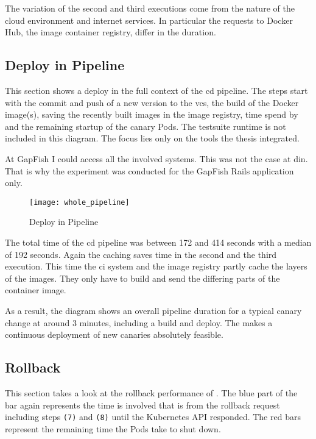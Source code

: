 The variation of the second and third executions come from the nature of the cloud
environment and internet services. In particular the requests to Docker Hub, the image container
registry, differ in the duration.

\subsection{Deploy in Pipeline}

This section shows a deploy in the full context of the \gls{cd} pipeline. The steps start
with the commit and push of a new version to the \gls{vcs}, the build of the
Docker image(s), saving the recently built images in the image registry, time spend by
\deployer and the remaining startup of the canary Pods. The testsuite runtime is not
included in this diagram. The focus lies only on the tools the thesis integrated.

At GapFish I could access all the involved systems. This was not the case at \gls{din}. That is
why the experiment was conducted for the GapFish Rails application only.

\begin{figure}[htbp]
  \centering
  \texttt{[image: whole\_pipeline]}
  \caption{Deploy in Pipeline}
  \label{fig:whole pipeline}
\end{figure}

The total time of the \gls{cd} pipeline was between 172 and 414 seconds with a median of
192 seconds. Again the caching saves time in the second and the third execution. This time
the \gls{ci} system and the image registry partly cache the layers of the images. They
only have to build and send the differing parts of the container image.

As a result, the diagram shows an overall pipeline duration for a typical canary change at around
3 minutes, including a build and deploy. The makes a continuous deployment of
new canaries absolutely feasible.

\subsection{Rollback}

This section takes a look at the rollback performance of \deployer. The blue part
of the bar again represents the time \deployer is involved that is from the rollback
request including steps \texttt{(7)} and \texttt{(8)} until the Kubernetes API responded. The red bars
represent the remaining time the Pods take to shut down.


